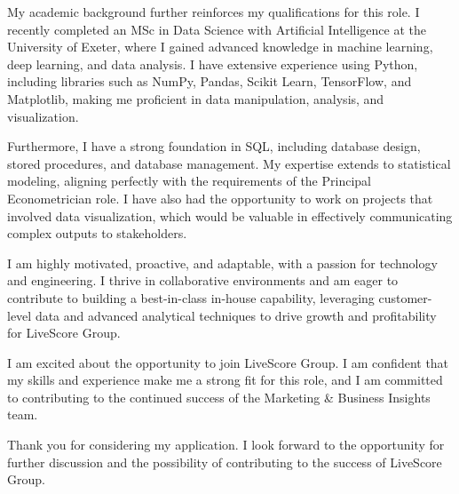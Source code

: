 \documentclass[../main.tex]{subfiles}
\begin{document}
\begin{cvletter}
\begin{cvletter}
My academic background further reinforces my qualifications for this role. I recently completed an MSc in Data Science with Artificial Intelligence at the University of Exeter, where I gained advanced knowledge in machine learning, deep learning, and data analysis. I have extensive experience using Python, including libraries such as NumPy, Pandas, Scikit Learn, TensorFlow, and Matplotlib, making me proficient in data manipulation, analysis, and visualization.

Furthermore, I have a strong foundation in SQL, including database design, stored procedures, and database management. My expertise extends to statistical modeling, aligning perfectly with the requirements of the Principal Econometrician role. I have also had the opportunity to work on projects that involved data visualization, which would be valuable in effectively communicating complex outputs to stakeholders.

I am highly motivated, proactive, and adaptable, with a passion for technology and engineering. I thrive in collaborative environments and am eager to contribute to building a best-in-class in-house capability, leveraging customer-level data and advanced analytical techniques to drive growth and profitability for LiveScore Group.

I am excited about the opportunity to join LiveScore Group. I am confident that my skills and experience make me a strong fit for this role, and I am committed to contributing to the continued success of the Marketing \& Business Insights team.

Thank you for considering my application. I look forward to the opportunity for further discussion and the possibility of contributing to the success of LiveScore Group.
\end{cvletter}

\makeletterclosing

\vspace*{\fill}

\end{cvletter}
\end{document}
